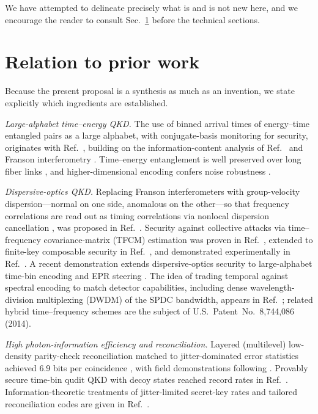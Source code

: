 \documentclass[11pt]{article}
\begin{document}
We have attempted to delineate precisely what is and is not new here, and we encourage the reader to consult Sec.~\ref{sec:prior} before the technical sections.

\section{Relation to prior work}
\label{sec:prior}

Because the present proposal is a synthesis as much as an invention, we state explicitly which ingredients are established.

\emph{Large-alphabet time--energy QKD.} The use of binned arrival times of energy--time entangled pairs as a large alphabet, with conjugate-basis monitoring for security, originates with Ref.~\cite{AliKhan2007}, building on the information-content analysis of Ref.~\cite{AliKhanHowell2006} and Franson interferometry \cite{Franson1989}. Time--energy entanglement is well preserved over long fiber links \cite{Tittel1998,Marcikic2004}, and higher-dimensional encoding confers noise robustness \cite{Cerf2002}.

\emph{Dispersive-optics QKD.} Replacing Franson interferometers with group-velocity dispersion---normal on one side, anomalous on the other---so that frequency correlations are read out as timing correlations via nonlocal dispersion cancellation \cite{Franson1992,Baek2009}, was proposed in Ref.~\cite{Mower2013}. Security against collective attacks via time--frequency covariance-matrix (TFCM) estimation was proven in Ref.~\cite{Zhang2014}, extended to finite-key composable security in Ref.~\cite{Niu2016}, and demonstrated experimentally in Ref.~\cite{Lee2014}. A recent demonstration extends dispersive-optics security to large-alphabet time-bin encoding and EPR steering \cite{Chang2024}. The idea of trading temporal against spectral encoding to match detector capabilities, including dense wavelength-division multiplexing (DWDM) of the SPDC bandwidth, appears in Ref.~\cite{Mower2011}; related hybrid time--frequency schemes are the subject of U.S.~Patent~No.~8,744,086 (2014).

\emph{High photon-information efficiency and reconciliation.} Layered (multilevel) low-density parity-check reconciliation matched to jitter-dominated error statistics achieved 6.9 bits per coincidence \cite{Zhong2015}, with field demonstrations following \cite{Lee2016}. Provably secure time-bin qudit QKD with decoy states reached record rates in Ref.~\cite{Islam2017}. Information-theoretic treatments of jitter-limited secret-key rates and tailored reconciliation codes are given in Ref.~\cite{Boutros2023}.
\end{document}
